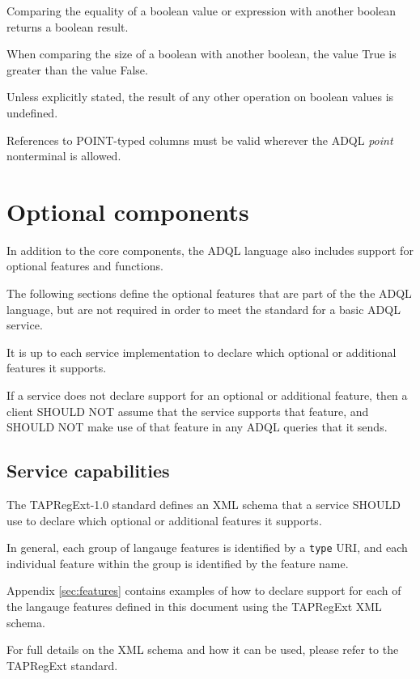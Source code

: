 \documentclass[11pt,a4paper]{ivoa}
\begin{document}
Comparing the equality of a boolean value or expression with another
boolean returns a boolean result.

When comparing the size of a boolean with another boolean, the value
True is greater than the value False.

Unless explicitly stated, the result of any other operation on boolean
values is undefined.

References to POINT-typed columns must be valid wherever the ADQL
\textit{point} nonterminal is allowed.

\clearpage
\section{Optional components}
\label{sec:optional}

In addition to the core components, the ADQL language also includes support
for optional features and functions.

The following sections define the optional features that are part of the
the ADQL language, but are not required in order to meet the standard for
a basic ADQL service.

It is up to each service implementation to declare which optional or
additional features it supports.

If a service does not declare support for an optional or additional feature,
then a client SHOULD NOT assume that the service supports that feature,
and SHOULD NOT make use of that feature in any ADQL queries that it sends.

\subsection{Service capabilities}
\label{sec:capabilities}

The TAPRegExt-1.0 standard \citep{std:TAPREGEXT} defines an XML schema that a service SHOULD
use to declare which optional or additional features it supports.

In general, each group of langauge features is identified by a \verb:type:
URI, and each individual feature within the group is identified by the
feature name.

Appendix \ref{sec:features} contains examples of how to declare support
for each of the langauge features defined in this document using the
TAPRegExt XML schema.

For full details on the XML schema and how it can be used, please refer to
the TAPRegExt \citep{std:TAPREGEXT} standard.
\end{document}
